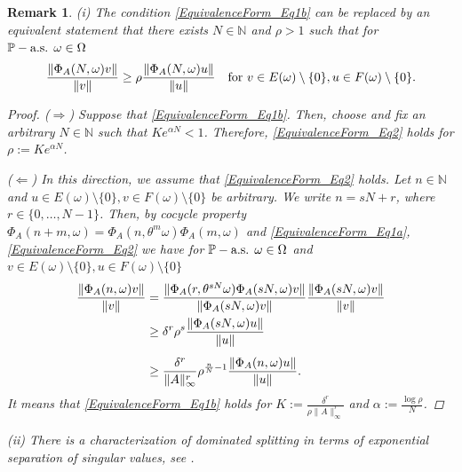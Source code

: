 \documentclass[pdflatex,sn-mathphys-num]{sn-jnl}%
\theoremstyle{thmstyleone}%
\theoremstyle{thmstyletwo}%
\newtheorem{remark}{Remark}
\theoremstyle{thmstylethree}%
\newcommand{\N}{\mathbb{N}}
\newcommand{\mP}{\mathbb{P}}
\numberwithin{equation}{section}
\begin{document}
%
%
%
%
\begin{remark}\label{Equivalence_DominatedSplitting}
(i) The condition \eqref{EquivalenceForm_Eq1b} can be replaced by an equivalent statement that 
there exists $N\in\N$ and $\rho>1$ such that for $\mP- \hbox{a.s. } \omega\in\Omega$
\begin{equation}\label{EquivalenceForm_Eq2}
\frac{\|\Phi_A(N,\omega)v\|}{\|v\|}
\geq
\rho 
 \frac{\|\Phi_A(N,\omega)u\|}{\|u\|} \quad \hbox{for }  
 v\in E(\omega)\setminus\{0\}, u\in F(\omega)\setminus\{0\}.    
 \end{equation}

%
\begin{proof}
($\Rightarrow$) Suppose that \eqref{EquivalenceForm_Eq1b}. Then, choose and fix an arbitrary $N\in\N$ such that $Ke^{\alpha N}<1$. Therefore, \eqref{EquivalenceForm_Eq2} holds for $\rho:=K e^{\alpha N}$.

\noindent 
($\Leftarrow$) In this direction, we assume that  \eqref{EquivalenceForm_Eq2} holds. Let  $n\in\N$ and  $u\in E(\omega)\setminus\{0\}, v\in F(\omega)\setminus\{0\}$ be arbitrary. We write $n=sN+r$, where $r\in\{0,\dots,N-1\}$. Then, by cocycle property $\Phi_A(n+m,\omega)=\Phi_A(n,\theta^m\omega)\Phi_A(m,\omega)$ and \eqref{EquivalenceForm_Eq1a}, \eqref{EquivalenceForm_Eq2} we have  for $\mP- \hbox{a.s. } \omega\in\Omega$ and  $v\in E(\omega)\setminus\{0\}, u\in F(\omega)\setminus\{0\}$
\begin{align}
\frac{\|\Phi_A(n,\omega)v\|}{\|v\|}
& =\frac{\|\Phi_A(r,\theta^{sN}\omega)\Phi_A(sN,\omega)v\|}{\|\Phi_A(sN,\omega)v\|}\frac{\|\Phi_A(sN,\omega)v\|}{\|v\|}\notag\\
& \geq \delta^r \rho^s  \frac{\|\Phi_A(sN,\omega)u\|}{\|u\|}\notag\\[1ex]
& \geq \frac{\delta^r}{\|A\|_{\infty}^r}\rho^{\frac{n}{N}-1} \frac{\|\Phi_A(n,\omega)u\|}{\|u\|}.
\end{align}
It means that \eqref{EquivalenceForm_Eq1b} holds for $K:=\frac{\delta^r}{\rho \|A\|_{\infty}^r}$ and $\alpha:=\frac{\log\rho}{N}$.
\end{proof}
%

(ii) There is a characterization of dominated splitting in terms of exponential separation of singular values, see  \cite{Bochi09,Blumenthal19,Quas_19}.
 \end{remark}
%
%
%
%
\end{document}
